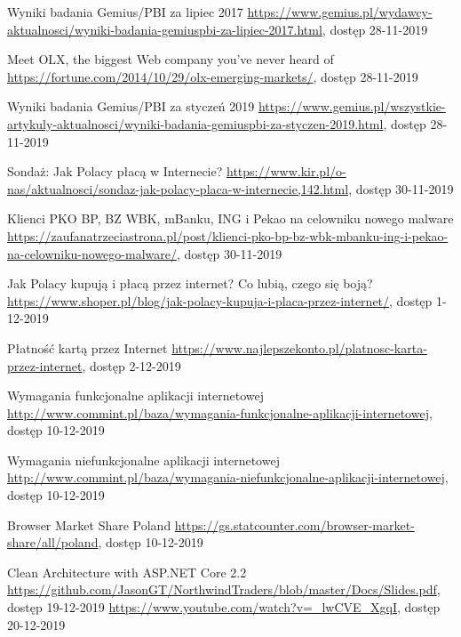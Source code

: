 \documentclass[12pt]{article}
\numberwithin{figure}{section}
\begin{document}
\begin{sloppypar}
\begin{thebibliography}{99}
    Wyniki badania Gemius/PBI za lipiec 2017
    \url{https://www.gemius.pl/wydawcy-aktualnosci/wyniki-badania-gemiuspbi-za-lipiec-2017.html}, dostęp 28-11-2019
    
    Meet OLX, the biggest Web company you’ve never heard of
    \url{https://fortune.com/2014/10/29/olx-emerging-markets/}, dostęp 28-11-2019
    
    Wyniki badania Gemius/PBI za styczeń 2019
    \url{https://www.gemius.pl/wszystkie-artykuly-aktualnosci/wyniki-badania-gemiuspbi-za-styczen-2019.html}, dostęp 28-11-2019
    
    Sondaż: Jak Polacy płacą w Internecie?
    \url{https://www.kir.pl/o-nas/aktualnosci/sondaz-jak-polacy-placa-w-internecie,142.html}, dostęp 30-11-2019
    
    Klienci PKO BP, BZ WBK, mBanku, ING i Pekao na celowniku nowego malware
    \url{https://zaufanatrzeciastrona.pl/post/klienci-pko-bp-bz-wbk-mbanku-ing-i-pekao-na-celowniku-nowego-malware/}, dostęp 30-11-2019
    
    Jak Polacy kupują i płacą przez internet? Co lubią, czego się boją?
    \url{https://www.shoper.pl/blog/jak-polacy-kupuja-i-placa-przez-internet/}, dostęp 1-12-2019
    
    Płatność kartą przez Internet
    \url{https://www.najlepszekonto.pl/platnosc-karta-przez-internet}, dostęp 2-12-2019
    
    Wymagania funkcjonalne aplikacji internetowej
    \url{http://www.commint.pl/baza/wymagania-funkcjonalne-aplikacji-internetowej}, dostęp 10-12-2019
    
    Wymagania niefunkcjonalne aplikacji internetowej
    \url{http://www.commint.pl/baza/wymagania-niefunkcjonalne-aplikacji-internetowej}, dostęp 10-12-2019
    
    Browser Market Share Poland
    \url{https://gs.statcounter.com/browser-market-share/all/poland}, dostęp 10-12-2019
    
    Clean Architecture with ASP.NET Core 2.2
    \url{https://github.com/JasonGT/NorthwindTraders/blob/master/Docs/Slides.pdf}, dostęp 19-12-2019
    \url{https://www.youtube.com/watch?v=_lwCVE_XgqI}, dostęp 20-12-2019
    

\end{thebibliography}
\end{sloppypar}
\end{document}
